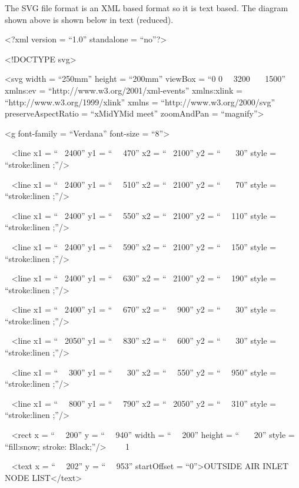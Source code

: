 The SVG file format is an XML based format so it is text based. The diagram shown above is shown below in text (reduced).

\textless{}?xml version = ``1.0'' standalone = ``no''?\textgreater{}

\textless{}!DOCTYPE svg\textgreater{}

\textless{}svg width = ``250mm'' height = ``200mm'' viewBox = ``0 0~~ 3200~~~ 1500'' xmlns:ev = ``http://www.w3.org/2001/xml-events'' xmlns:xlink = ``http://www.w3.org/1999/xlink'' xmlns = ``http://www.w3.org/2000/svg'' preserveAspectRatio = ``xMidYMid meet'' zoomAndPan = ``magnify''\textgreater{}

\textless{}g font-family = ``Verdana'' font-size = ``8''\textgreater{}

~ \textless{}line x1 = ``~ 2400'' y1 = ``~~ 470'' x2 = ``~ 2100'' y2 = ``~~~ 30'' style = ``stroke:linen ;''/\textgreater{}

~ \textless{}line x1 = ``~ 2400'' y1 = ``~~ 510'' x2 = ``~ 2100'' y2 = ``~~~ 70'' style = ``stroke:linen ;''/\textgreater{}

~ \textless{}line x1 = ``~ 2400'' y1 = ``~~ 550'' x2 = ``~ 2100'' y2 = ``~~ 110'' style = ``stroke:linen ;''/\textgreater{}

~ \textless{}line x1 = ``~ 2400'' y1 = ``~~ 590'' x2 = ``~ 2100'' y2 = ``~~ 150'' style = ``stroke:linen ;''/\textgreater{}

~ \textless{}line x1 = ``~ 2400'' y1 = ``~~ 630'' x2 = ``~ 2100'' y2 = ``~~ 190'' style = ``stroke:linen ;''/\textgreater{}

~ \textless{}line x1 = ``~ 2400'' y1 = ``~~ 670'' x2 = ``~~ 900'' y2 = ``~~~ 30'' style = ``stroke:linen ;''/\textgreater{}

~ \textless{}line x1 = ``~ 2050'' y1 = ``~~ 830'' x2 = ``~~ 600'' y2 = ``~~~ 30'' style = ``stroke:linen ;''/\textgreater{}

~ \textless{}line x1 = ``~~ 300'' y1 = ``~~~ 30'' x2 = ``~~ 550'' y2 = ``~~ 950'' style = ``stroke:linen ;''/\textgreater{}

~ \textless{}line x1 = ``~~ 800'' y1 = ``~~ 790'' x2 = ``~ 2050'' y2 = ``~~ 310'' style = ``stroke:linen ;''/\textgreater{}

~ \textless{}rect x = ``~~ 200'' y = ``~~ 940'' width = ``~~ 200'' height = ``~~~ 20'' style = ``fill:snow; stroke: Black;''/\textgreater{}~~~ ~1

~ \textless{}text x = ``~~ 202'' y = ``~~ 953'' startOffset = ``0''\textgreater{}OUTSIDE AIR INLET NODE LIST\textless{}/text\textgreater{}


